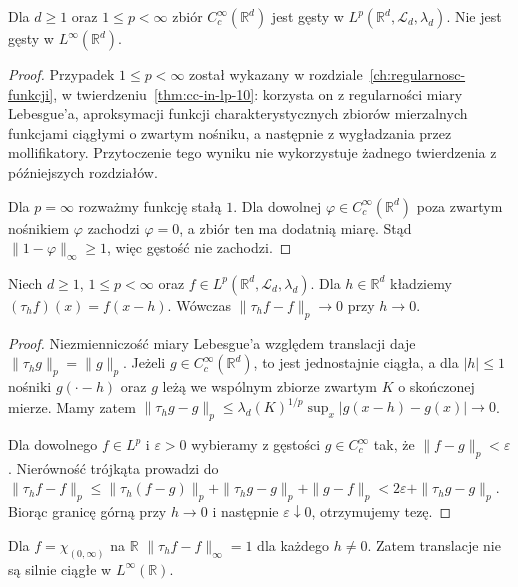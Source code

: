 \begin{twierdzenie}
\label{thm:cc-dense-lp-14}
Dla $d\ge1$ oraz $1\le p<\infty$ zbiór
$C_c^\infty(\mathbb R^d)$ jest gęsty w
$L^p(\mathbb R^d,\mathcal L_d,\lambda_d)$.
Nie jest gęsty w $L^\infty(\mathbb R^d)$.
\end{twierdzenie}
\begin{proof}
Przypadek $1\le p<\infty$ został wykazany
w rozdziale~\ref{ch:regularnosc-funkcji},
w twierdzeniu~\ref{thm:cc-in-lp-10}:
korzysta on z regularności miary Lebesgue'a,
aproksymacji funkcji charakterystycznych zbiorów mierzalnych
funkcjami ciągłymi o zwartym nośniku,
a następnie z wygładzania przez mollifikatory.
Przytoczenie tego wyniku nie wykorzystuje
żadnego twierdzenia z późniejszych rozdziałów.

Dla $p=\infty$ rozważmy funkcję stałą $1$.
Dla dowolnej $\varphi\in C_c^\infty(\mathbb R^d)$
poza zwartym nośnikiem $\varphi$ zachodzi $\varphi=0$,
a zbiór ten ma dodatnią miarę. Stąd
$\|1-\varphi\|_\infty\ge1$, więc gęstość nie zachodzi.
\end{proof}

\begin{twierdzenie}
\label{thm:translation-lp-14}
Niech $d\ge1$, $1\le p<\infty$ oraz
$f\in L^p(\mathbb R^d,\mathcal L_d,\lambda_d)$.
Dla $h\in\mathbb R^d$ kładziemy
$(\tau_hf)(x)=f(x-h)$.
Wówczas $\|\tau_hf-f\|_p\to0$ przy $h\to0$.
\end{twierdzenie}
\begin{proof}
Niezmienniczość miary Lebesgue'a względem translacji
daje $\|\tau_hg\|_p=\|g\|_p$.
Jeżeli $g\in C_c^\infty(\mathbb R^d)$, to jest
jednostajnie ciągła, a dla $|h|\le1$
nośniki $g(\cdot-h)$ oraz $g$ leżą we wspólnym
zbiorze zwartym $K$ o skończonej mierze.
Mamy zatem
$\|\tau_hg-g\|_p\le
\lambda_d(K)^{1/p}\sup_x|g(x-h)-g(x)|\to0$.

Dla dowolnego $f\in L^p$ i $\varepsilon>0$
wybieramy z gęstości $g\in C_c^\infty$ tak, że
$\|f-g\|_p<\varepsilon$.
Nierówność trójkąta prowadzi do
$\|\tau_hf-f\|_p\le
\|\tau_h(f-g)\|_p+\|\tau_hg-g\|_p+\|g-f\|_p
<2\varepsilon+\|\tau_hg-g\|_p$.
Biorąc granicę górną przy $h\to0$ i następnie
$\varepsilon\downarrow0$, otrzymujemy tezę.
\end{proof}

\begin{przyklad}[Dlaczego $p=\infty$ jest inny]
Dla $f=\chi_{(0,\infty)}$ na $\mathbb R$
$\|\tau_hf-f\|_\infty=1$ dla każdego $h\ne0$.
Zatem translacje nie są silnie ciągłe w
$L^\infty(\mathbb R)$.
\end{przyklad}

